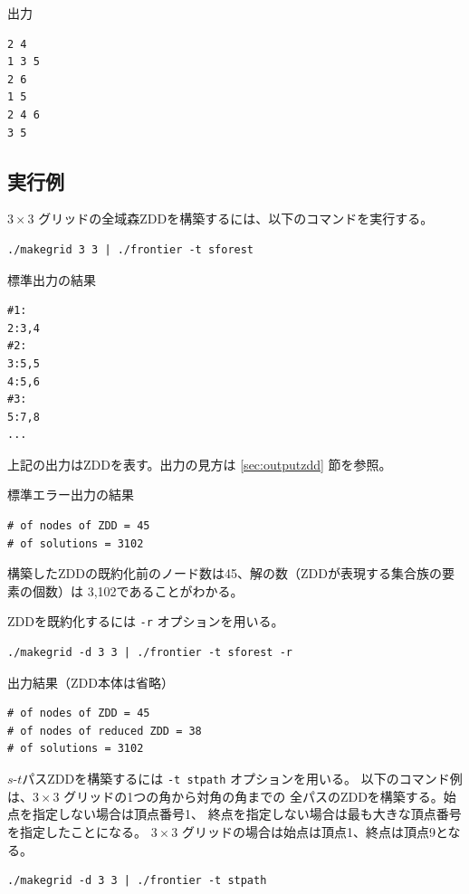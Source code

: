\documentclass{jsarticle}
\begin{document}
出力

\begin{verbatim}
2 4
1 3 5
2 6
1 5
2 4 6
3 5
\end{verbatim}

\subsection{実行例}

$3 \times 3$ グリッドの全域森ZDDを構築するには、以下のコマンドを実行する。

\begin{verbatim}
./makegrid 3 3 | ./frontier -t sforest
\end{verbatim}

標準出力の結果

\begin{verbatim}
#1:
2:3,4
#2:
3:5,5
4:5,6
#3:
5:7,8
...
\end{verbatim}

上記の出力はZDDを表す。出力の見方は \ref{sec:outputzdd} 節を参照。

標準エラー出力の結果

\begin{verbatim}
# of nodes of ZDD = 45
# of solutions = 3102
\end{verbatim}

構築したZDDの既約化前のノード数は45、解の数（ZDDが表現する集合族の要素の個数）は
3,102であることがわかる。

ZDDを既約化するには \texttt{-r} オプションを用いる。

\begin{verbatim}
./makegrid -d 3 3 | ./frontier -t sforest -r
\end{verbatim}

出力結果（ZDD本体は省略）

\begin{verbatim}
# of nodes of ZDD = 45
# of nodes of reduced ZDD = 38
# of solutions = 3102
\end{verbatim}

$s$-$t$パスZDDを構築するには \texttt{-t stpath} オプションを用いる。
以下のコマンド例は、$3 \times 3$ グリッドの1つの角から対角の角までの
全パスのZDDを構築する。始点を指定しない場合は頂点番号1、
終点を指定しない場合は最も大きな頂点番号を指定したことになる。
$3 \times 3$ グリッドの場合は始点は頂点1、終点は頂点9となる。

\begin{verbatim}
./makegrid -d 3 3 | ./frontier -t stpath
\end{verbatim}
\end{document}
